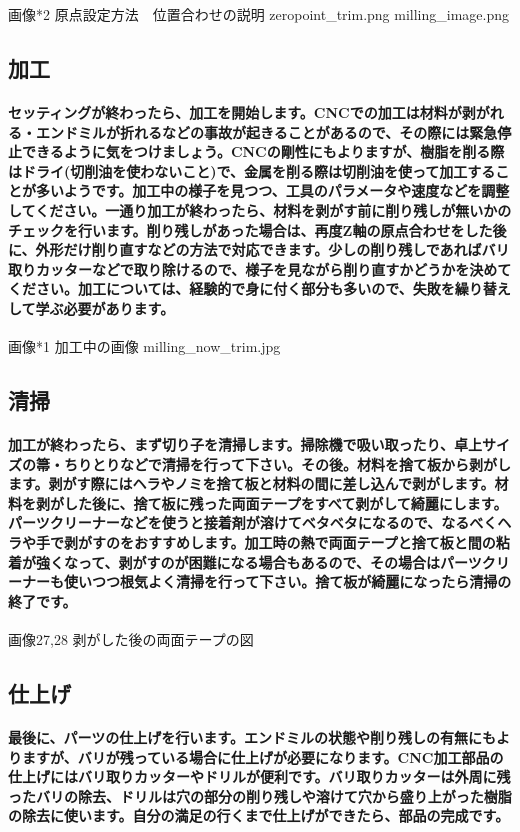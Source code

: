 \documentclass[b5paper, 9pt, twocolumn, titlepage,openany]{jsbook}%
\begin{document}
画像*2 原点設定方法　位置合わせの説明 zeropoint_trim.png milling_image.png

\subsection{加工}
\paragraph{セッティングが終わったら、加工を開始します。CNCでの加工は材料が剥がれる・エンドミルが折れるなどの事故が起きることがあるので、その際には緊急停止できるように気をつけましょう。CNCの剛性にもよりますが、樹脂を削る際はドライ(切削油を使わないこと)で、金属を削る際は切削油を使って加工することが多いようです。加工中の様子を見つつ、工具のパラメータや速度などを調整してください。一通り加工が終わったら、材料を剥がす前に削り残しが無いかのチェックを行います。削り残しがあった場合は、再度Z軸の原点合わせをした後に、外形だけ削り直すなどの方法で対応できます。少しの削り残しであればバリ取りカッターなどで取り除けるので、様子を見ながら削り直すかどうかを決めてください。加工については、経験的で身に付く部分も多いので、失敗を繰り替えして学ぶ必要があります。}

画像*1 加工中の画像 milling_now_trim.jpg

\subsection{清掃}
\paragraph{加工が終わったら、まず切り子を清掃します。掃除機で吸い取ったり、卓上サイズの箒・ちりとりなどで清掃を行って下さい。その後。材料を捨て板から剥がします。剥がす際にはヘラやノミを捨て板と材料の間に差し込んで剥がします。材料を剥がした後に、捨て板に残った両面テープをすべて剥がして綺麗にします。パーツクリーナーなどを使うと接着剤が溶けてベタベタになるので、なるべくヘラや手で剥がすのをおすすめします。加工時の熱で両面テープと捨て板と間の粘着が強くなって、剥がすのが困難になる場合もあるので、その場合はパーツクリーナーも使いつつ根気よく清掃を行って下さい。捨て板が綺麗になったら清掃の終了です。}

画像27,28 剥がした後の両面テープの図

\subsection{仕上げ}
\paragraph{最後に、パーツの仕上げを行います。エンドミルの状態や削り残しの有無にもよりますが、バリが残っている場合に仕上げが必要になります。CNC加工部品の仕上げにはバリ取りカッターやドリルが便利です。バリ取りカッターは外周に残ったバリの除去、ドリルは穴の部分の削り残しや溶けて穴から盛り上がった樹脂の除去に使います。自分の満足の行くまで仕上げができたら、部品の完成です。}
\end{document}
